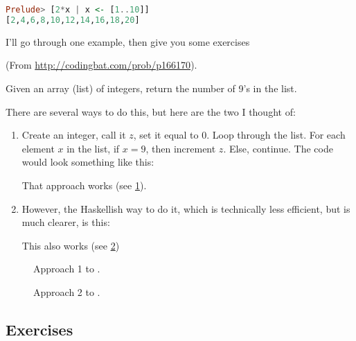 \begin{lstlisting}[language=Haskell]
Prelude> [2*x | x <- [1..10]]
[2,4,6,8,10,12,14,16,18,20]
\end{lstlisting}

I'll go through one example, then give you some exercises

\begin{example}
  (From \url{http://codingbat.com/prob/p166170}).

  Given an array (list) of integers, return the number of 9's in the
  list.

  \begin{solution}
    There are several ways to do this, but here are the two I thought
    of:

    \begin{enumerate}
    \item Create an integer, call it $z$, set it equal to $0$. Loop
      through the list. For each element $x$ in the list, if $x = 9$,
      then increment $z$. Else, continue. The code would look
      something like this:


      That approach works (see \cref{fig:array_count9-1}).

    \item However, the Haskellish way to do it, which is technically
      less efficient, but is much clearer, is this:


      This also works (see \cref{fig:array_count9-2})
    \end{enumerate}
  \end{solution}
\end{example}

\begin{figure}[h]
  \centering
  \caption{Approach 1 to .}
  \label{fig:array_count9-1}
\end{figure}

\begin{figure}[h]
  \centering
  \caption{Approach 2 to .}
  \label{fig:array_count9-2}
\end{figure}

\subsection{Exercises}

